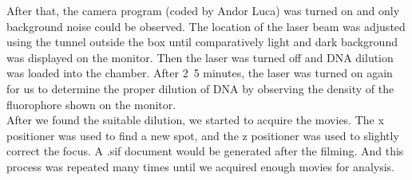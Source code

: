\documentclass[a4paper,english,12pt,bibliography=totoc]{scrreprt}
\begin{document}
After that, the camera program (coded by Andor Luca) was turned on and only background noise could be observed. The location of the laser beam was adjusted using the tunnel outside the box until comparatively light and dark background was displayed on the monitor. Then the laser was turned off and DNA dilution was loaded into the chamber. After 2~5 minutes, the laser was turned on again for us to determine the proper dilution of DNA by observing the density of the fluorophore shown on the monitor.\\

After we found the suitable dilution, we started to acquire the movies. The x positioner was used to find a new spot, and the z positioner was used to slightly correct the focus. A .sif document would be generated after the filming. And this process was repeated many times until we acquired enough movies for analysis.

\end{document}
